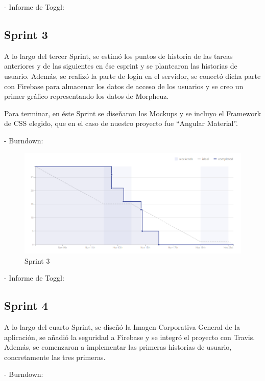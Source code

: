 \documentclass[11pt,openany]{book}
\begin{document}
- Informe de Toggl:



\subsection{Sprint 3}

A lo largo del tercer Sprint, se estimó los puntos de historia de las tareas anteriores y de las siguientes en ése esprint y se plantearon las historias de usuario. Además, se realizó la parte de login en el servidor, se conectó dicha parte con Firebase para almacenar los datos de acceso de los usuarios y se creo un primer gráfico representando los datos de Morpheuz. 

Para terminar, en éste Sprint se diseñaron los Mockups y se incluyo el Framework de CSS elegido, que en el caso de nuestro proyecto fue ``Angular Material''.

- Burndown:

\begin{figure}[H]
\centering
\includegraphics[totalheight=7cm]{burndowns/Sprint3.png}
\caption{Sprint 3}
\end{figure}

- Informe de Toggl:



\subsection{Sprint 4}

A lo largo del cuarto Sprint, se diseñó la Imagen Corporativa General de la aplicación, se añadió la seguridad a Firebase y se integró el proyecto con Travis. Además, se comenzaron a implementar las primeras historias de usuario, concretamente las tres primeras.

- Burndown:
\end{document}
